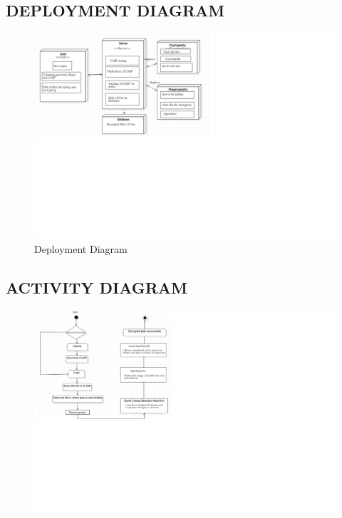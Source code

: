     \subsection*{DEPLOYMENT DIAGRAM}
     \begin{figure}[H]
  \centering
  \includegraphics[scale=0.65]{deployment.png}
  \caption{Deployment Diagram}
  \end{figure}
  \pagebreak  
    \subsection*{ACTIVITY DIAGRAM}
    \begin{figure}[H]
  \centering
  \includegraphics[scale=0.75]{activ.png}\\
  
\end{figure}
    
